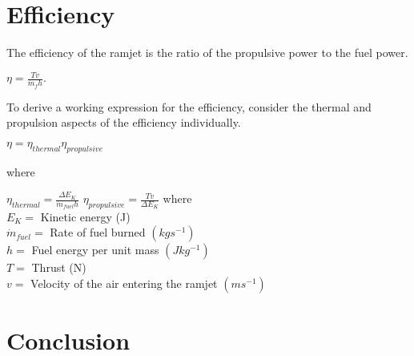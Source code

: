 \documentclass[12pt,onecolumn]{IEEEtran}
\begin{document}
\section{Efficiency}
The efficiency of the ramjet is the ratio of the propulsive power to the fuel power.\cite{greitzer_spakovsky_waitz}\\
\begin{center}
$ \eta = \frac{Tv}{\dot{m}_f h}. $
\end{center}
To derive a working expression for the efficiency, consider the thermal and propulsion aspects of the efficiency individually.\\
\begin{center}
$ \eta = \eta_{thermal} \eta_{propulsive}$
\end{center}
where\\
\begin{center}
$
\eta_{thermal}=\frac{\Delta E_K}{\dot{m}_{fuel}h}
$
$
\eta_{propulsive}=\frac{Tv}{\Delta E_K}
$
\vspace{1mm}
where\\
\vspace{1mm}
$
E_K = $ Kinetic energy (J)\\
\vspace{1mm}
$\dot{m}_{fuel} = $ Rate of fuel burned $(kgs^{-1})$\\
\vspace{1mm}
$h = $ Fuel energy per unit mass $(Jkg^{-1})$\\
\vspace{1mm}
$T = $ Thrust (N)\\
\vspace{1mm}
$v = $ Velocity of the air entering the ramjet $(ms^{-1})$\\
\end{center}
\section{Conclusion}



\end{document}

